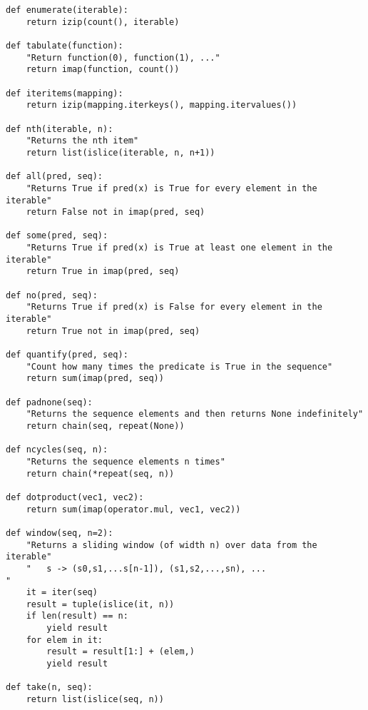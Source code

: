 \begin{verbatim}
def enumerate(iterable):
    return izip(count(), iterable)

def tabulate(function):
    "Return function(0), function(1), ..."
    return imap(function, count())

def iteritems(mapping):
    return izip(mapping.iterkeys(), mapping.itervalues())

def nth(iterable, n):
    "Returns the nth item"
    return list(islice(iterable, n, n+1))

def all(pred, seq):
    "Returns True if pred(x) is True for every element in the iterable"
    return False not in imap(pred, seq)

def some(pred, seq):
    "Returns True if pred(x) is True at least one element in the iterable"
    return True in imap(pred, seq)

def no(pred, seq):
    "Returns True if pred(x) is False for every element in the iterable"
    return True not in imap(pred, seq)

def quantify(pred, seq):
    "Count how many times the predicate is True in the sequence"
    return sum(imap(pred, seq))

def padnone(seq):
    "Returns the sequence elements and then returns None indefinitely"
    return chain(seq, repeat(None))

def ncycles(seq, n):
    "Returns the sequence elements n times"
    return chain(*repeat(seq, n))

def dotproduct(vec1, vec2):
    return sum(imap(operator.mul, vec1, vec2))

def window(seq, n=2):
    "Returns a sliding window (of width n) over data from the iterable"
    "   s -> (s0,s1,...s[n-1]), (s1,s2,...,sn), ...                   "
    it = iter(seq)
    result = tuple(islice(it, n))
    if len(result) == n:
        yield result    
    for elem in it:
        result = result[1:] + (elem,)
        yield result

def take(n, seq):
    return list(islice(seq, n))

\end{verbatim}
